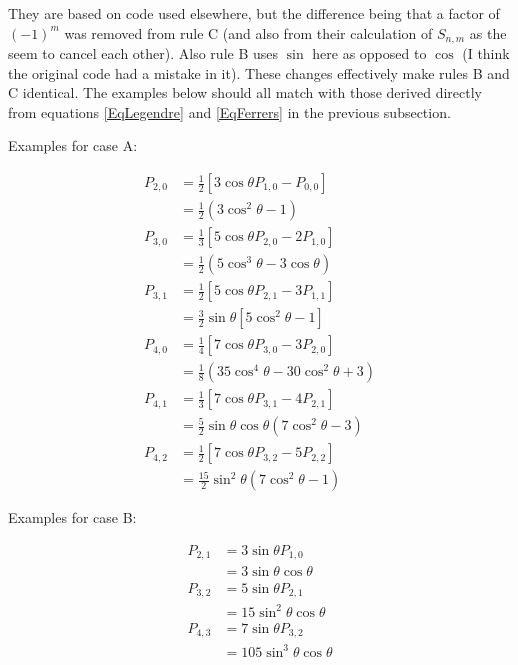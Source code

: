 \documentclass[]{article}
\begin{document}
		They are based on code used elsewhere, but the difference being that a factor of $(-1)^m$ was removed from rule C (and also from their calculation of $S_{n,m}$ as the seem to cancel each other). Also rule B uses $\sin$ here as opposed to $\cos$ (I think the original code had a mistake in it). These changes effectively make rules B and C identical. The examples below should all match with those derived directly from equations \ref{EqLegendre} and \ref{EqFerrers} in the previous subsection.
		
		Examples for case A:
		
		\begin{align}
			P_{2,0} &= \frac{1}{2}\left[ 3\cos{\theta} P_{1,0} - P_{0,0} \right] \\
					&= \frac{1}{2}(3\cos^2{\theta} - 1) \\
			P_{3,0} &= \frac{1}{3}\left[5\cos{\theta}P_{2,0} - 2P_{1,0}\right] \\
					&= \frac{1}{2}(5 \cos^3{\theta} - 3\cos{\theta}) \\
			P_{3,1} &= \frac{1}{2}\left[5 \cos{\theta} P_{2,1} - 3P_{1,1}\right] \\
					&= \frac{3}{2}\sin{\theta}\left[5 \cos^2{\theta} - 1\right] \\
			P_{4,0} &= \frac{1}{4}\left[7\cos{\theta}P_{3,0} - 3P_{2,0}\right] \\
					&= \frac{1}{8}(35 \cos^4{\theta} - 30\cos^2{\theta} + 3) \\
			P_{4,1} &= \frac{1}{3}\left[7\cos{\theta} P_{3,1} - 4P_{2,1}\right] \\
					&= \frac{5}{2}\sin{\theta}\cos{\theta}(7\cos^2{\theta} - 3) \\
			P_{4,2} &= \frac{1}{2}\left[7\cos{\theta}P_{3,2} - 5P_{2,2}\right] \\
					&= \frac{15}{2}\sin^2{\theta}(7\cos^2{\theta} -1)
		\end{align}
		
		Examples for case B:
		
		\begin{align}
			P_{2,1} &= 3\sin{\theta}P_{1,0} \\
					&= 3\sin{\theta}\cos{\theta} \\
			P_{3,2} &= 5\sin{\theta}P_{2,1} \\
					&= 15\sin^2{\theta}\cos{\theta} \\
			P_{4,3} &= 7\sin{\theta}P_{3,2} \\
					&= 105\sin^3{\theta}\cos{\theta} 
		\end{align}
		
\end{document}
